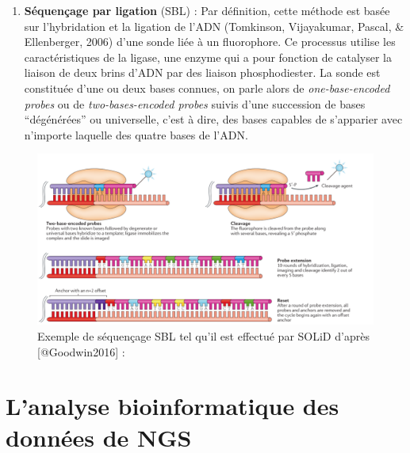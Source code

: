 \documentclass[12pt,twoside]{reedthesis}
\providecommand{\tightlist}{%
  \setlength{\itemsep}{0pt}\setlength{\parskip}{0pt}}
\theoremstyle{definition}
\theoremstyle{definition}
\theoremstyle{remark}
\begin{document}
  \begin{enumerate}
  \def\labelenumi{\arabic{enumi}.}
  \setcounter{enumi}{1}
  \tightlist
  \item
    \textbf{Séquençage par ligation} (SBL) : Par définition, cette méthode
    est basée sur l'hybridation et la ligation de l'ADN (Tomkinson,
    Vijayakumar, Pascal, \& Ellenberger, 2006) d'une sonde liée à un
    fluorophore. Ce processus utilise les caractéristiques de la ligase,
    une enzyme qui a pour fonction de catalyser la liaison de deux brins
    d'ADN par des liaison phosphodiester. La sonde est constituée d'une ou
    deux bases connues, on parle alors de \emph{one-base-encoded probes}
    ou de \emph{two-bases-encoded probes} suivis d'une succession de bases
    ``dégénérées'' ou universelle, c'est à dire, des bases capables de
    s'apparier avec n'importe laquelle des quatre bases de l'ADN.
  \end{enumerate}
  
  \begin{figure}
  
  {\centering \includegraphics[scale=.26]{figure/SBL_seq_solid} 
  
  }
  
  \caption[Exemple de séquençage SBL tel qu'il est effectué par SOLiD]{Exemple de séquençage SBL tel qu'il est effectué par SOLiD d'après [@Goodwin2016] : }\label{fig:sblSeq}
  \end{figure}
  
  \newpage  
  
  \section{L'analyse bioinformatique des données de
  NGS}\label{lanalyse-bioinformatique-des-donnees-de-ngs}
  
\end{document}
